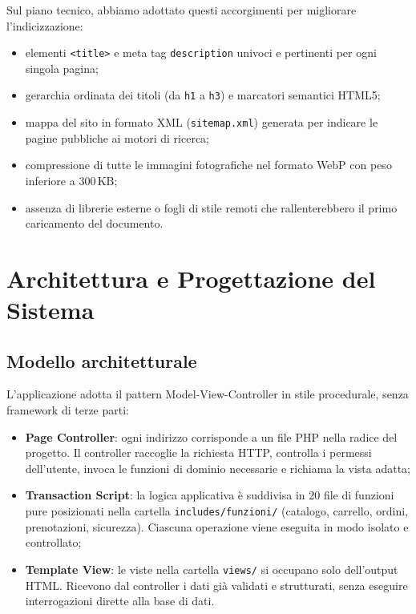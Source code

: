 \documentclass[a4paper,11pt]{article}
\begin{document}
Sul piano tecnico, abbiamo adottato questi accorgimenti per migliorare l'indicizzazione:
\begin{itemize}
    \item elementi \texttt{<title>} e meta tag \texttt{description} univoci e pertinenti per ogni singola pagina;
    \item gerarchia ordinata dei titoli (da \texttt{h1} a \texttt{h3}) e marcatori semantici HTML5;
    \item mappa del sito in formato XML (\texttt{sitemap.xml}) generata per indicare le pagine pubbliche ai motori di ricerca;
    \item compressione di tutte le immagini fotografiche nel formato WebP con peso inferiore a 300\,KB;
    \item assenza di librerie esterne o fogli di stile remoti che rallenterebbero il primo caricamento del documento.
\end{itemize}

\section{Architettura e Progettazione del Sistema}

\subsection{Modello architetturale}
L'applicazione adotta il pattern Model-View-Controller in stile procedurale, senza framework di terze parti:
\begin{itemize}
    \item \textbf{Page Controller}: ogni indirizzo corrisponde a un file PHP nella radice del progetto. Il controller raccoglie la richiesta HTTP, controlla i permessi dell'utente, invoca le funzioni di dominio necessarie e richiama la vista adatta;
    \item \textbf{Transaction Script}: la logica applicativa è suddivisa in 20 file di funzioni pure posizionati nella cartella \texttt{includes/funzioni/} (catalogo, carrello, ordini, prenotazioni, sicurezza). Ciascuna operazione viene eseguita in modo isolato e controllato;
    \item \textbf{Template View}: le viste nella cartella \texttt{views/} si occupano solo dell'output HTML. Ricevono dal controller i dati già validati e strutturati, senza eseguire interrogazioni dirette alla base di dati.
\end{itemize}
\end{document}
